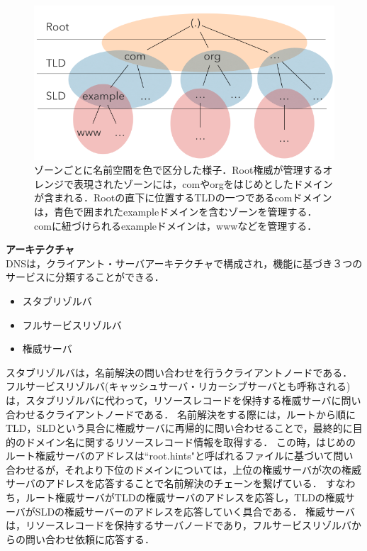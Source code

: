 \begin{figure}[th]
 \centering
 \includegraphics[width=12.0cm]{figure/dns-architecture.png}
 \caption[ゾーンごとに分割された名前空間]{ゾーンごとに名前空間を色で区分した様子．Root権威が管理するオレンジで表現されたゾーンには，comやorgをはじめとしたドメインが含まれる．Rootの直下に位置するTLDの一つであるcomドメインは，青色で囲まれたexampleドメインを含むゾーンを管理する．comに紐づけられるexampleドメインは，wwwなどを管理する．}
 \label{fig:dns-architecture}
\end{figure}

\textbf{アーキテクチャ}\\
DNSは，クライアント・サーバアーキテクチャで構成され，機能に基づき３つのサービスに分類することができる．
\begin{itemize}
 \item スタブリゾルバ
 \vspace{-3mm}
 \item フルサービスリゾルバ
 \vspace{-3mm}
 \item 権威サーバ
\end{itemize}

スタブリゾルバは，名前解決の問い合わせを行うクライアントノードである．
フルサービスリゾルバ(キャッシュサーバ・リカーシブサーバとも呼称される)は，スタブリゾルバに代わって，リソースレコードを保持する権威サーバに問い合わせるクライアントノードである．
名前解決をする際には，ルートから順にTLD，SLDという具合に権威サーバに再帰的に問い合わせることで，最終的に目的のドメイン名に関するリソースレコード情報を取得する．
この時，はじめのルート権威サーバのアドレスは``root.hints"と呼ばれるファイルに基づいて問い合わせるが，それより下位のドメインについては，上位の権威サーバが次の権威サーバのアドレスを応答することで名前解決のチェーンを繋げている．
すなわち，ルート権威サーバがTLDの権威サーバのアドレスを応答し，TLDの権威サーバがSLDの権威サーバーのアドレスを応答していく具合である．
権威サーバは，リソースレコードを保持するサーバノードであり，フルサービスリゾルバからの問い合わせ依頼に応答する．

